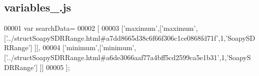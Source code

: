 \subsection{variables\+\_.\+js}
\label{variables__2_8js_source}

\begin{DoxyCode}
00001 var searchData=
00002 [
00003   [\textcolor{stringliteral}{'maximum'},[\textcolor{stringliteral}{'maximum'},[\textcolor{stringliteral}{'../structSoapySDRRange.html#a7dd8665d38c6f66f306c1ce0868fd71f'},1,\textcolor{stringliteral}{'SoapySDRRange'}]
      ]],
00004   [\textcolor{stringliteral}{'minimum'},[\textcolor{stringliteral}{'minimum'},[\textcolor{stringliteral}{'../structSoapySDRRange.html#a6de3066aaf77a4bff5cd2599ca5e1b31'},1,\textcolor{stringliteral}{'SoapySDRRange'}]
      ]]
00005 ];
\end{DoxyCode}
